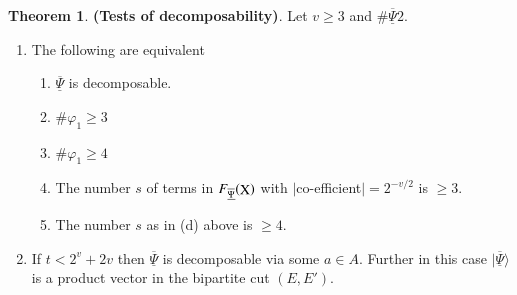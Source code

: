 \documentclass[a4paper,12pt]{article}
\DeclareMathOperator{\x}{\mathrm{X}}
\theoremstyle{definition}
\theoremstyle{underlinethm}
\newtheorem{thm}{Theorem}[section]
\theoremstyle{definition}
\begin{document}
\begin{thm}\label{3.2}
{\bf (Tests of decomposability)}. Let $v\geq 3$ and $\# \underline{\overline{\Psi}} 2$.
\begin{enumerate}[label=(\roman*)]
\item The following are equivalent
\begin{enumerate}[label=(\alph*)]
\item $\underline{\overline{\Psi}}$ is decomposable.

\item $\# \varphi_{1} \geq 3$

\item $\# \varphi_{1} \geq 4$

\item The number $s$ of terms in $F_{\underline{\overline{\Psi}}}(\bold{\x})$ with $|$co-efficient$|= 2^{-v/2}$ is $\geq 3$.

\item The number $s$  as in (d) above is $\geq 4$.

\end{enumerate}

\item If $t < 2^{v} + 2v$ then $\underline{\overline{\Psi}}$ is decomposable via  some $a \in A$. Further in this case $| \underline{\overline{\Psi}} \rangle$ is a product vector in the bipartite cut $(E, E')$.
\end{enumerate}

\end{thm}
\end{document}
